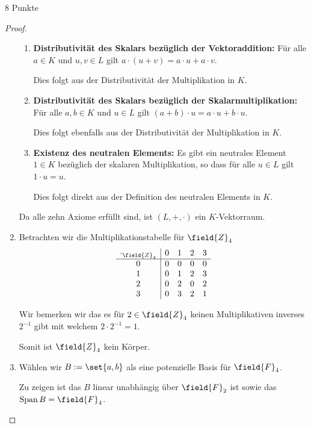 \documentclass{problemset}
\begin{document}
\begin{problem}{8 Punkte}
\begin{proof}
\begin{enumerate}
\begin{enumerate}
			      \item \textbf{Distributivität des Skalars bezüglich der Vektoraddition:} Für alle $a \in K$ und $u, v \in L$ gilt $a \cdot (u + v) = a \cdot u + a \cdot v$.

			            Dies folgt aus der Distributivität der Multiplikation in $K$.

			      \item \textbf{Distributivität des Skalars bezüglich der Skalarmultiplikation:} Für alle $a, b \in K$ und $u \in L$ gilt $(a + b) \cdot u = a \cdot u + b \cdot u$.

			            Dies folgt ebenfalls aus der Distributivität der Multiplikation in $K$.

			      \item \textbf{Existenz des neutralen Elements:} Es gibt ein neutrales Element $1 \in K$ bezüglich der skalaren Multiplikation, so dass für alle $u \in L$ gilt $1 \cdot u = u$.

			            Dies folgt direkt aus der Definition des neutralen Elements in $K$.
		      \end{enumerate}

		      Da alle zehn Axiome erfüllt sind, ist $(L, +, \cdot)$ ein $K$-Vektorraum.

		\item Betrachten wir die Multiplikationstabelle für $\field{Z}_4$
		      \[
			      \begin{array}{c|cccc}
				      \cdot_{\field{Z}_4} & 0 & 1 & 2 & 3 \\
				      \hline
				      0                   & 0 & 0 & 0 & 0 \\
				      1                   & 0 & 1 & 2 & 3 \\
				      2                   & 0 & 2 & 0 & 2 \\
				      3                   & 0 & 3 & 2 & 1 \\
			      \end{array}
		      \]

		      Wir bemerken wir das es für $2 \in \field{Z}_4$ keinen Multiplikativen inverses $2^{-1}$ gibt mit welchem $2 \cdot 2^{-1} = 1$.

		      Somit ist $\field{Z}_4$ kein Körper. \checkmark
		\item Wählen wir $B := \set{a, b}$ als eine potenzielle Basis für $\field{F}_4$.

		      Zu zeigen ist das $B$ linear unabhängig über $\field{F}_2$ ist sowie das $\operatorname{Span} B = \field{F}_4$.


\end{enumerate}
\end{proof}
\end{problem}
\end{document}
